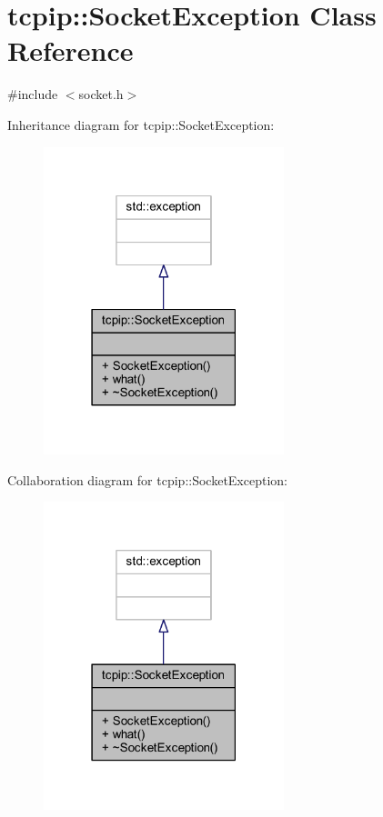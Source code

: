\hypertarget{classtcpip_1_1_socket_exception}{}\section{tcpip\+:\+:Socket\+Exception Class Reference}
\label{classtcpip_1_1_socket_exception}


{\ttfamily \#include $<$socket.\+h$>$}



Inheritance diagram for tcpip\+:\+:Socket\+Exception\+:
\nopagebreak
\begin{figure}[H]
\begin{center}
\leavevmode
\includegraphics[width=198pt]{classtcpip_1_1_socket_exception__inherit__graph}
\end{center}
\end{figure}


Collaboration diagram for tcpip\+:\+:Socket\+Exception\+:
\nopagebreak
\begin{figure}[H]
\begin{center}
\leavevmode
\includegraphics[width=198pt]{classtcpip_1_1_socket_exception__coll__graph}
\end{center}
\end{figure}

